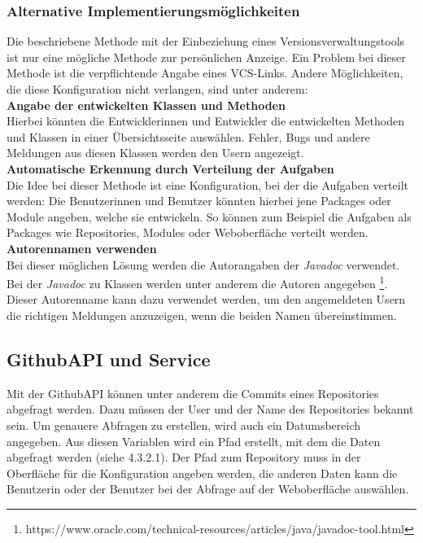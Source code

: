 \subsubsection{Alternative Implementierungsmöglichkeiten}
Die beschriebene Methode mit der Einbeziehung eines Versionsverwaltungstools ist nur eine mögliche Methode zur persönlichen Anzeige. Ein Problem bei dieser Methode ist die verpflichtende Angabe eines VCS-Links. Andere Möglichkeiten, die diese Konfiguration nicht verlangen, sind unter anderem: \\
\textbf{Angabe der entwickelten Klassen und Methoden} \\
Hierbei könnten die Entwicklerinnen und Entwickler die entwickelten Methoden und Klassen in einer Übersichtsseite auswählen. Fehler, Bugs und andere Meldungen aus diesen Klassen werden den Usern angezeigt.\\
\textbf{Automatische Erkennung durch Verteilung der Aufgaben} \\
Die Idee bei dieser Methode ist eine Konfiguration, bei der die Aufgaben verteilt werden: Die Benutzerinnen und Benutzer könnten hierbei jene Packages oder Module angeben, welche sie entwickeln. So können zum Beispiel die Aufgaben als Packages wie Repositories, Modules oder Weboberfläche verteilt werden. \\
\textbf{Autorennamen verwenden} \\
Bei dieser möglichen Lösung werden die Autorangaben der \textit{Javadoc} verwendet. Bei der \textit{Javadoc} zu Klassen werden unter anderem die Autoren angegeben \footnote{https://www.oracle.com/technical-resources/articles/java/javadoc-tool.html}. Dieser Autorenname kann dazu verwendet werden, um den angemeldeten Usern die richtigen Meldungen anzuzeigen, wenn die beiden Namen übereinstimmen.
\subsection{GithubAPI und Service}
Mit der GithubAPI können unter anderem die Commits eines Repositories abgefragt werden. Dazu müssen der User und der Name des Repositories bekannt sein. Um genauere Abfragen zu erstellen, wird auch ein Datumsbereich angegeben. Aus diesen Variablen wird ein Pfad erstellt, mit dem die Daten abgefragt werden (siehe 4.3.2.1). Der Pfad zum Repository muss in der Oberfläche für die Konfiguration angeben werden, die anderen Daten kann die Benutzerin oder der Benutzer bei der Abfrage auf der Weboberfläche auswählen. 
